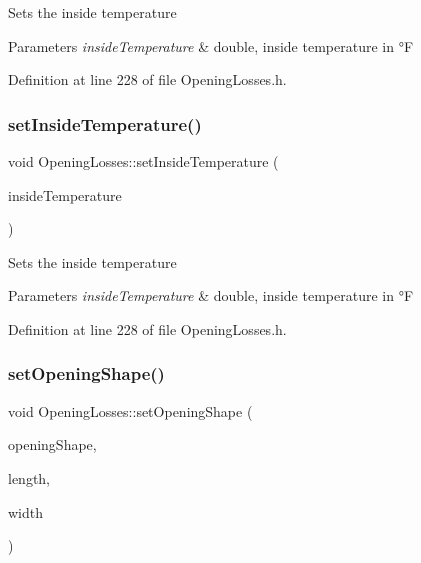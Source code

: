 Sets the inside temperature 
\begin{DoxyParams}{Parameters}
{\em inside\+Temperature} & double, inside temperature in °F \\
\hline
\end{DoxyParams}


Definition at line 228 of file Opening\+Losses.\+h.

\mbox{\label{class_opening_losses_a895dcaa81bbb3dc823ec903480f05262}} 
\subsubsection{\texorpdfstring{set\+Inside\+Temperature()}{setInsideTemperature()}\hspace{0.1cm}{\footnotesize\ttfamily [3/3]}}
{\footnotesize\ttfamily void Opening\+Losses\+::set\+Inside\+Temperature (\begin{DoxyParamCaption}\item[{double}]{inside\+Temperature }\end{DoxyParamCaption})\hspace{0.3cm}{\ttfamily [inline]}}

Sets the inside temperature 
\begin{DoxyParams}{Parameters}
{\em inside\+Temperature} & double, inside temperature in °F \\
\hline
\end{DoxyParams}


Definition at line 228 of file Opening\+Losses.\+h.

\mbox{\label{class_opening_losses_a19c28e02d1e736d74b3c82047d4d23b2}} 
\subsubsection{\texorpdfstring{set\+Opening\+Shape()}{setOpeningShape()}\hspace{0.1cm}{\footnotesize\ttfamily [1/6]}}
{\footnotesize\ttfamily void Opening\+Losses\+::set\+Opening\+Shape (\begin{DoxyParamCaption}\item[{\hyperlink{class_opening_losses_a57f9759b6fd72a1b75aa885800e26157}{Opening\+Shape} const}]{opening\+Shape,  }\item[{const double}]{length,  }\item[{const double}]{width }\end{DoxyParamCaption})\hspace{0.3cm}{\ttfamily [inline]}}

